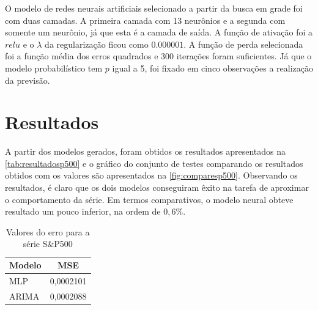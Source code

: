 \documentclass[
    12pt,
    oneside,
    a4paper,
    english,
    brazil
]{abntex2}
\begin{document}
O modelo  de redes neurais artificiais  selecionado a partir da  busca em grade
foi  com duas  camadas. A  primeira camada  com 13  neurônios e  a segunda  com
somente um neurônio, já que esta é a  camada de saída. A função de ativação foi
a $relu$  e o  $\lambda$ da  regularização ficou como  $0.000001$. A  função de
perda selecionada foi a função média  dos erros quadrados e 300 iterações foram
suficientes. Já que  o modelo probabilístico tem  $p$ igual a 5,  foi fixado em
cinco observações a realização da previsão.

\chapter{Resultados}\label{chap:result}

A  partir  dos  modelos  gerados,  foram  obtidos  os  resultados  apresentados
na   \autoref{tab:resultadosp500}   e  o   gráfico   do   conjunto  de   testes
comparando  os   resultados  obtidos  com   os  valores  são   apresentados  na
\autoref{fig:comparesp500}.  Observando  os resultados,  é  claro  que os  dois
modelos conseguiram êxito  na tarefa de aproximar o comportamento  da série. Em
termos comparativos,  o modelo  neural obteve resultado  um pouco  inferior, na
ordem de $0,6\%$.

\begin{table}[ht]
    \centering
    \caption{Valores do erro para a série S\&P500}\label{tab:resultadosp500}
    \begin{tabular}{ll}
        \multicolumn{1}{c}{Modelo} & \multicolumn{1}{c}{MSE} \\
        \toprule
        MLP                        & 0,0002101               \\
        ARIMA                      & 0,0002088
    \end{tabular}
\end{table}
\end{document}
